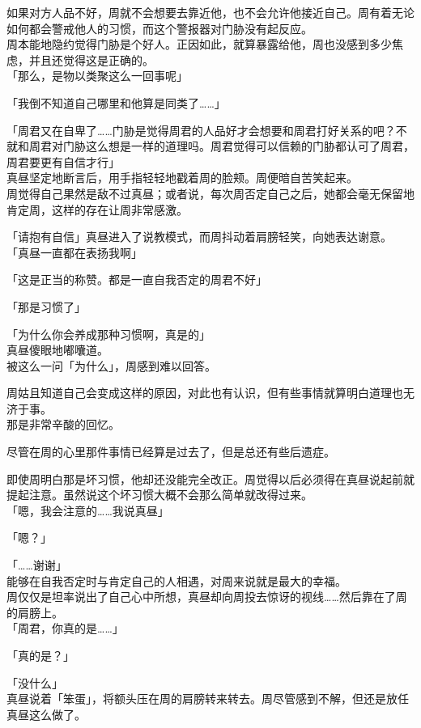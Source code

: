 如果对方人品不好，周就不会想要去靠近他，也不会允许他接近自己。周有着无论如何都会警戒他人的习惯，而这个警报器对门胁没有起反应。\\

周本能地隐约觉得门胁是个好人。正因如此，就算暴露给他，周也没感到多少焦虑，并且还觉得这是正确的。\\

「那么，是物以类聚这么一回事呢」

「我倒不知道自己哪里和他算是同类了……」

「周君又在自卑了……门胁是觉得周君的人品好才会想要和周君打好关系的吧？不就和周君对门胁这么想是一样的道理吗。周君觉得可以信赖的门胁都认可了周君，周君要更有自信才行」\\

真昼坚定地断言后，用手指轻轻地戳着周的脸颊。周便暗自苦笑起来。\\

周觉得自己果然是敌不过真昼；或者说，每次周否定自己之后，她都会毫无保留地肯定周，这样的存在让周非常感激。

「请抱有自信」真昼进入了说教模式，而周抖动着肩膀轻笑，向她表达谢意。\\

「真昼一直都在表扬我啊」

「这是正当的称赞。都是一直自我否定的周君不好」

「那是习惯了」

「为什么你会养成那种习惯啊，真是的」\\

真昼傻眼地嘟囔道。\\

被这么一问「为什么」，周感到难以回答。

周姑且知道自己会变成这样的原因，对此也有认识，但有些事情就算明白道理也无济于事。\\

那是非常辛酸的回忆。

尽管在周的心里那件事情已经算是过去了，但是总还有些后遗症。

即使周明白那是坏习惯，他却还没能完全改正。周觉得以后必须得在真昼说起前就提起注意。虽然说这个坏习惯大概不会那么简单就改得过来。\\

「嗯，我会注意的……我说真昼」

「嗯？」

「……谢谢」\\

能够在自我否定时与肯定自己的人相遇，对周来说就是最大的幸福。\\

周仅仅是坦率说出了自己心中所想，真昼却向周投去惊讶的视线……然后靠在了周的肩膀上。\\

「周君，你真的是……」

「真的是？」

「没什么」\\

真昼说着「笨蛋」，将额头压在周的肩膀转来转去。周尽管感到不解，但还是放任真昼这么做了。
